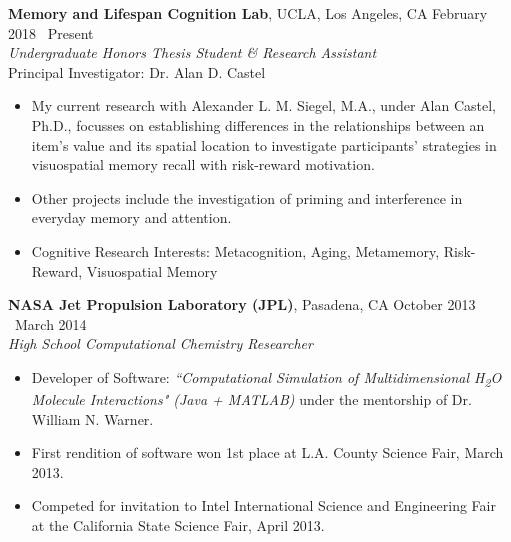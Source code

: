 \documentclass[margin]{res}
\begin{document}
\begin{resume}
		{\bf Memory and Lifespan Cognition Lab}, UCLA, Los Angeles, CA  \hfill February 2018 \textendash\ Present \\
		{\it Undergraduate Honors Thesis Student \& Research Assistant} \\
		Principal Investigator: Dr. Alan D. Castel
		\begin{itemize} \itemsep -2pt
			\item My current research with Alexander L. M. Siegel, M.A., under Alan Castel, Ph.D., focusses on establishing differences in the relationships between an item's value and its spatial location to investigate participants' strategies in visuospatial memory recall with risk-reward motivation. 
			\item Other projects include the investigation of priming and interference in everyday memory and attention.
			\item Cognitive Research Interests: Metacognition, Aging, Metamemory, Risk-Reward, Visuospatial Memory
		\end{itemize}
		
		{\bf NASA Jet Propulsion Laboratory (JPL)}, Pasadena, CA \hfill October 2013 \textendash\ March 2014 \\
		{\it High School Computational Chemistry Researcher}
		\begin{itemize} \itemsep -2pt
			\item Developer of Software: {\it ``Computational Simulation of Multidimensional H\textsubscript{2}O Molecule Interactions" (Java + MATLAB)} under the mentorship of Dr. William N. Warner.
			\item First rendition of software won 1st place at L.A. County Science Fair, March 2013.
			\item Competed for invitation to Intel International Science and Engineering Fair at the California State Science Fair, April 2013.
		\end{itemize}
		

\end{resume}
\end{document}
